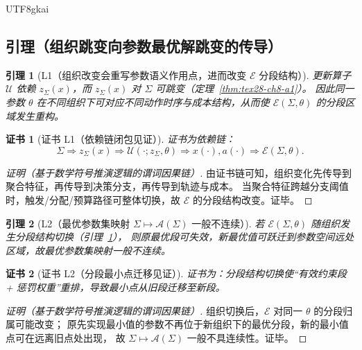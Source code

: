 \documentclass[12pt]{article}
\newtheorem{lemma}{引理}[section]
\newtheorem{Certificate}{证书}[section]
\begin{document}
\begin{CJK*}{UTF8}{gkai}
\subsection{引理（组织跳变向参数最优解跳变的传导）}
\label{subsec:tex28-ch8-lemmas}

\begin{lemma}[L1（组织改变会重写参数语义作用点，进而改变 $\mathcal{E}$ 分段结构）]
\label{lem:tex28-ch8-l1}
更新算子 $\mathcal{U}$ 依赖 $z_{\Sigma}(x)$，而 $z_{\Sigma}(x)$ 对 $\Sigma$ 可跳变（定理~\ref{thm:tex28-ch8-a1}）。
因此同一参数 $\theta$ 在不同组织下可对应不同动作时序与成本结构，从而使 $\mathcal{E}(\Sigma,\theta)$ 的分段区域发生重构。
\end{lemma}

\begin{Certificate}[证书 L1（依赖链闭包见证）]
\label{cert:tex28-ch8-l1}
证书为依赖链：
\[
  \Sigma\Rightarrow z_{\Sigma}(x)\Rightarrow \mathcal{U}(\cdot;z_{\Sigma},\theta)
  \Rightarrow x(\cdot),a(\cdot)\Rightarrow \mathcal{E}(\Sigma,\theta).
\]
\end{Certificate}

\begin{proof}[证明（基于数学符号推演逻辑的谓词因果链）]
由证书链可知，组织变化先传导到聚合特征，再传导到决策分支，再传导到轨迹与成本。
当聚合特征跨越分支阈值时，触发/分配/预算路径可整体切换，故 $\mathcal{E}$ 的分段结构改变。证毕。
\end{proof}

\begin{lemma}[L2（最优参数集映射 $\Sigma\mapsto\mathcal{A}(\Sigma)$ 一般不连续）]
\label{lem:tex28-ch8-l2}
若 $\mathcal{E}(\Sigma,\theta)$ 随组织发生分段结构切换（引理~\ref{lem:tex28-ch8-l1}），
则原最优段可失效，新最优值可跃迁到参数空间远处区域，故最优参数集映射一般不连续。
\end{lemma}

\begin{Certificate}[证书 L2（分段最小点迁移见证）]
\label{cert:tex28-ch8-l2}
证书为：分段结构切换使“有效约束段 + 惩罚权重”重排，导致最小点从旧段迁移至新段。
\end{Certificate}

\begin{proof}[证明（基于数学符号推演逻辑的谓词因果链）]
组织切换后，$\mathcal{E}$ 对同一 $\theta$ 的分段归属可能改变；
原先实现最小值的参数不再位于新组织下的最优分段，新的最小值点可在远离旧点处出现，
故 $\Sigma\mapsto\mathcal{A}(\Sigma)$ 一般不具连续性。证毕。
\end{proof}


\end{CJK*}
\end{document}
